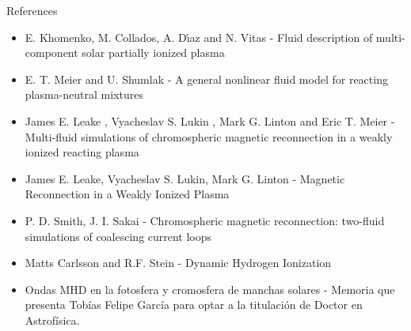 \documentclass{beamer}
\begin{document}
\begin{frame}{References}


{\small
\begin{itemize}

\item E. Khomenko,  M. Collados,  A. Dı́az and N. Vitas - Fluid description of multi-component solar partially ionized plasma

\item E. T. Meier  and U. Shumlak - A general nonlinear fluid model for reacting plasma-neutral mixtures

\item James E. Leake , Vyacheslav S. Lukin  , Mark G. Linton  and Eric T. Meier - Multi-fluid simulations of chromospheric magnetic reconnection
in a weakly ionized reacting plasma

\item James E. Leake,   Vyacheslav S. Lukin, Mark G. Linton - Magnetic Reconnection in a Weakly Ionized Plasma

\item P. D. Smith, J. I. Sakai - Chromospheric magnetic reconnection: two-fluid
simulations of coalescing current loops

\item Matts Carlsson and R.F. Stein - Dynamic Hydrogen Ionization

\item Ondas MHD en la fotosfera y
cromosfera de manchas solares - 
Memoria que presenta
Tob\'ias Felipe Garc\'ia
para optar a la titulaci\'on
de Doctor en Astrof\'isica.

\end{itemize}
}
\end{frame}
\end{document}
